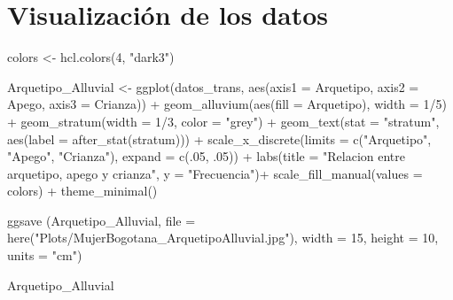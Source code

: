 \documentclass[
  letterpaper,
  DIV=11,
  numbers=noendperiod]{scrartcl}
\newenvironment{Shaded}{\begin{snugshade}}{\end{snugshade}}
\newcommand{\AttributeTok}[1]{\textcolor[rgb]{0.40,0.45,0.13}{#1}}
\newcommand{\DecValTok}[1]{\textcolor[rgb]{0.68,0.00,0.00}{#1}}
\newcommand{\FunctionTok}[1]{\textcolor[rgb]{0.28,0.35,0.67}{#1}}
\newcommand{\NormalTok}[1]{\textcolor[rgb]{0.00,0.23,0.31}{#1}}
\newcommand{\OtherTok}[1]{\textcolor[rgb]{0.00,0.23,0.31}{#1}}
\newcommand{\SpecialCharTok}[1]{\textcolor[rgb]{0.37,0.37,0.37}{#1}}
\newcommand{\StringTok}[1]{\textcolor[rgb]{0.13,0.47,0.30}{#1}}
\begin{document}
\section{Visualización de los
datos}\label{visualizaciuxf3n-de-los-datos}

\begin{Shaded}
\begin{Highlighting}[]
\NormalTok{colors }\OtherTok{\textless{}{-}} \FunctionTok{hcl.colors}\NormalTok{(}\DecValTok{4}\NormalTok{, }\StringTok{"dark3"}\NormalTok{)}

\NormalTok{Arquetipo\_Alluvial }\OtherTok{\textless{}{-}} \FunctionTok{ggplot}\NormalTok{(datos\_trans,}
       \FunctionTok{aes}\NormalTok{(}\AttributeTok{axis1 =}\NormalTok{ Arquetipo, }\AttributeTok{axis2 =}\NormalTok{ Apego, }\AttributeTok{axis3 =}\NormalTok{ Crianza)) }\SpecialCharTok{+}
  \FunctionTok{geom\_alluvium}\NormalTok{(}\FunctionTok{aes}\NormalTok{(}\AttributeTok{fill =}\NormalTok{ Arquetipo), }\AttributeTok{width =} \DecValTok{1}\SpecialCharTok{/}\DecValTok{5}\NormalTok{) }\SpecialCharTok{+}
  \FunctionTok{geom\_stratum}\NormalTok{(}\AttributeTok{width =} \DecValTok{1}\SpecialCharTok{/}\DecValTok{3}\NormalTok{, }\AttributeTok{color =} \StringTok{"grey"}\NormalTok{) }\SpecialCharTok{+}
  \FunctionTok{geom\_text}\NormalTok{(}\AttributeTok{stat =} \StringTok{"stratum"}\NormalTok{, }\FunctionTok{aes}\NormalTok{(}\AttributeTok{label =} \FunctionTok{after\_stat}\NormalTok{(stratum))) }\SpecialCharTok{+}
  \FunctionTok{scale\_x\_discrete}\NormalTok{(}\AttributeTok{limits =} \FunctionTok{c}\NormalTok{(}\StringTok{"Arquetipo"}\NormalTok{, }\StringTok{"Apego"}\NormalTok{, }\StringTok{"Crianza"}\NormalTok{), }\AttributeTok{expand =} \FunctionTok{c}\NormalTok{(.}\DecValTok{05}\NormalTok{, .}\DecValTok{05}\NormalTok{)) }\SpecialCharTok{+}
  \FunctionTok{labs}\NormalTok{(}\AttributeTok{title =} \StringTok{"Relacion entre arquetipo, apego y crianza"}\NormalTok{,}
       \AttributeTok{y =} \StringTok{"Frecuencia"}\NormalTok{)}\SpecialCharTok{+}
  \FunctionTok{scale\_fill\_manual}\NormalTok{(}\AttributeTok{values =}\NormalTok{ colors) }\SpecialCharTok{+}
  \FunctionTok{theme\_minimal}\NormalTok{() }

\FunctionTok{ggsave}\NormalTok{ (Arquetipo\_Alluvial,}
        \AttributeTok{file =} \FunctionTok{here}\NormalTok{(}\StringTok{"Plots/MujerBogotana\_ArquetipoAlluvial.jpg"}\NormalTok{),}
        \AttributeTok{width =} \DecValTok{15}\NormalTok{,}
        \AttributeTok{height =} \DecValTok{10}\NormalTok{,}
        \AttributeTok{units =} \StringTok{"cm"}\NormalTok{)}

\NormalTok{Arquetipo\_Alluvial}
\end{Highlighting}
\end{Shaded}
\end{document}
